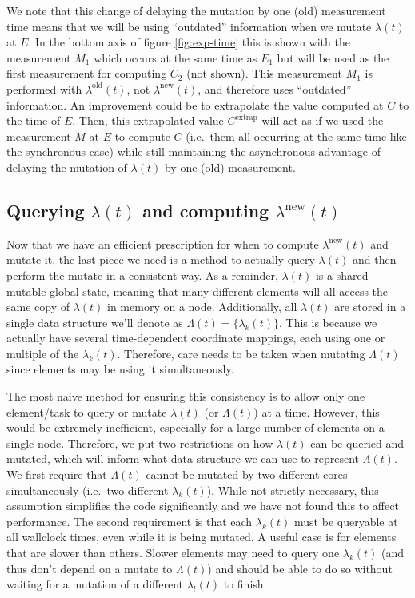 \begin{bibunit}[unsrtnat]
We note that this change of delaying the mutation by one (old)
measurement time means that we will be using ``outdated'' information when we
mutate $\lambda(t)$ at $E$. In the bottom axis of figure \ref{fig:exp-time} this
is shown with the measurement $M_1$ which occurs at the same time as $E_1$ but
will be used as the first measurement for computing $C_2$ (not shown). This
measurement $M_1$ is performed with $\lambda^\mathrm{old}(t)$, not
$\lambda^\mathrm{new}(t)$, and therefore uses ``outdated'' information. An
improvement could be to extrapolate the value computed at $C$ to the time of
$E$. Then, this extrapolated value $C^\mathrm{extrap}$ will act as if we used
the measurement $M$ at $E$ to compute $C$ (i.e.~them all occurring at the same
time like the synchronous case) while still maintaining the asynchronous
advantage of delaying the mutation of $\lambda(t)$ by one (old) measurement.

\subsection{Querying $\lambda(t)$ and computing $\lambda^\mathrm{new}(t)$\label{sec:async-update-lambda}}

Now that we have an efficient prescription for when to compute
$\lambda^\mathrm{new}(t)$ and mutate it, the last piece we need is a method to
actually query $\lambda(t)$ and then perform the mutate in a consistent way. As
a reminder, $\lambda(t)$ is a shared mutable global state, meaning that many
different elements will all access the same copy of $\lambda(t)$ in memory on a
node. Additionally, all $\lambda(t)$ are stored in a single data structure we'll
denote as $\Lambda(t) = \{ \lambda_k(t) \}$. This is because we actually have
several time-dependent coordinate mappings, each using one or multiple of the
$\lambda_k(t)$. Therefore, care needs to be taken when mutating $\Lambda(t)$
since elements may be using it simultaneously.

The most naive method for ensuring this consistency is to allow only one
element/task to query or mutate $\lambda(t)$ (or $\Lambda(t)$) at a time.
However, this would be extremely inefficient, especially for a large number of
elements on a single node. Therefore, we put two restrictions on how
$\lambda(t)$ can be queried and mutated, which will inform what data structure
we can use to represent $\Lambda(t)$. We first require that $\Lambda(t)$ cannot
be mutated by two different cores simultaneously (i.e.~two different
$\lambda_k(t)$). While not strictly necessary, this assumption simplifies the
code significantly and we have not found this to affect performance. The second
requirement is that each $\lambda_k(t)$ must be queryable at all wallclock
times, even while it is being mutated. A useful case is for elements that are
slower than others. Slower elements may need to query one $\lambda_k(t)$ (and
thus don't depend on a mutate to $\Lambda(t)$) and should be able to do so
without waiting for a mutation of a different $\lambda_l(t)$ to finish.


\end{bibunit}
